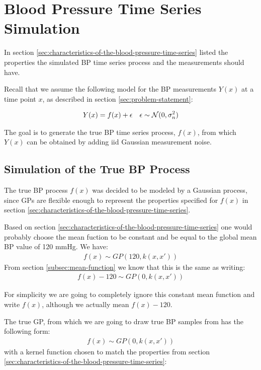 \section{Blood Pressure Time Series Simulation}\label{sec:blood-pressure-time-series-simulation}

In section \ref{sec:characteristics-of-the-blood-pressure-time-series} listed
the properties the simulated BP time series process and the measurements should have.

Recall that we assume the following model for the BP measurements $Y(x)$ at a time point $x$, as
described in section \ref{sec:problem-statement}:

\begin{align*}
    Y(x) = f(x) + \epsilon && \epsilon \sim \operatorname{\mathcal{N}}(0, \sigma_n^{2})
\end{align*}

The goal is to generate the true BP time series process, $f(x)$, from which
$Y(x)$ can be obtained by adding iid Gaussian measurement noise.

\subsection{Simulation of the True BP Process}

The true BP process $f(x)$ was decided to be modeled by a Gaussian process,
since GPs are flexible enough to represent the properties
specified for $f(x)$ in section \ref{sec:characteristics-of-the-blood-pressure-time-series}.

Based on section \ref{sec:characteristics-of-the-blood-pressure-time-series}
one would probably choose the mean fuction to be constant and be equal to the
global mean BP value of 120 mmHg. We have:
\begin{gather*}
    f(x) \sim GP(120, k(x,x'))
\end{gather*}
From section \ref{subsec:mean-function} we know that this is the same as writing:
\begin{gather*}
    f(x) - 120 \sim GP(0, k(x,x'))
\end{gather*}

For simplicity we are going to completely ignore this constant
mean function and write $f(x)$, although we actually mean $f(x) - 120$.

The true GP, from which we are going to draw true BP samples from has the following
form:
\begin{gather*}
    f(x) \sim GP(0, k(x,x'))
\end{gather*}
with a kernel function chosen to match the properties from
section \ref{sec:characteristics-of-the-blood-pressure-time-series}:

